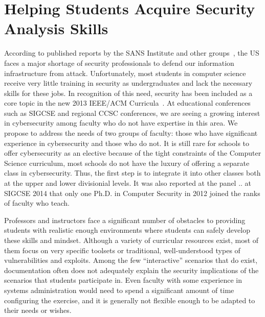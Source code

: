 

%


\section{Helping Students Acquire Security Analysis Skills}
\label{sec:intro}

According to published reports by the SANS Institute and other 
groups~\cite{defensenewsshortage}, the US faces a major shortage of 
security professionals to defend our information infrastructure from
attack.  Unfortunately, most students 
in computer science receive very little training in security as
undergraduates and lack the necessary skills 
for these jobs.  In recognition of this need, security has been included as
a core topic in the new 2013 
IEEE/ACM Curricula~\cite{acmcurriculum}.   At educational conferences such
as SIGCSE and regional CCSC conferences, we are seeing a growing interest 
in cybersecurity among faculty who do not have expertise in this area.
We propose to address the needs of two groups of faculty: those who have
significant experience in cybersecurity and those who do not.
It is still
rare for schools to offer cybersecurity as an elective
because of the tight 
constraints of the Computer Science curriculum, most schools 
do not have the luxury of offering a separate class in cybersecurity.  Thus, 
the first step is to integrate it into other classes both at the upper and lower divisionial
levels.  It was also reported at the panel .. at SIGCSE 2014 that only one Ph.D. in Computer
Security in 2012 joined the ranks of faculty who teach.

 Professors and instructors face a significant number of
obstacles to providing students with realistic enough environments
where students can safely develop these skills and mindset.  Although
a variety of curricular resources exist, most of them focus on very specific
toolsets or traditional, well-understood types of vulnerabilities and
exploits.  Among the few ``interactive'' scenarios that do exist, documentation
 often  does not adequately explain the
security implications of the scenarios that students participate in.  Even faculty
with some experience in systems administration would need to 
spend a significant amount of time configuring the exercise, and it is 
generally not flexible enough to be adapted to their needs or wishes.


